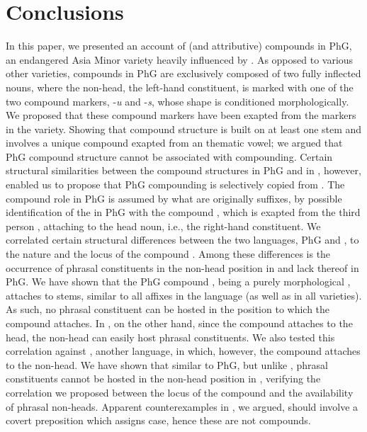 \documentclass[output=paper]{LSP/langsci}
\begin{document}
\section{Conclusions}
In this paper, we presented an account of  (and attributive) compounds in PhG, an endangered Asia Minor  variety heavily influenced by . As opposed to various other  varieties, compounds in PhG are exclusively composed of two fully inflected nouns, where the non-head, the left-hand constituent, is marked with one of the two compound markers, -\textit{u} and -\textit{s}, whose shape is conditioned morphologically. We proposed that these compound markers have been exapted from the  markers in the variety. Showing that  compound structure  is built on at least one stem and involves a unique compound  exapted from an  thematic vowel; we argued that PhG compound structure cannot be associated with  compounding. Certain structural similarities between the compound structures in PhG and in , however, enabled us to propose that PhG compounding is selectively copied from . The compound  role in PhG is assumed by what are originally  suffixes, by possible identification of the  in PhG with the  compound , which is exapted from the third person  , attaching to the head noun, i.e., the right-hand constituent. We correlated certain structural differences between the two languages, PhG and , to the nature and the locus of the compound . Among these differences is the occurrence of phrasal constituents in the non-head position in  and lack thereof in PhG. We have shown that the PhG compound , being a purely morphological , attaches to stems, similar to all affixes in the language (as well as in all  varieties). As such, no phrasal constituent can be hosted in the position to which the compound  attaches. In , on the other hand, since the compound  attaches to the head, the non-head can easily host phrasal constituents. We also tested this correlation against  , another  language, in which, however, the compound  attaches to the non-head. We have shown that similar to PhG, but unlike , phrasal constituents cannot be hosted in the non-head position in , verifying the correlation we proposed between the locus of the compound  and the availability of phrasal non-heads. Apparent counterexamples in , we argued, should involve a covert preposition which assigns  case, hence these are not compounds. 
\end{document}
